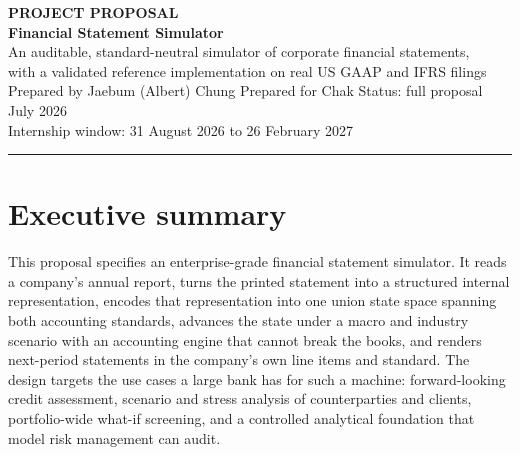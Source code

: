 \documentclass[11pt]{article}
\begin{document}
\color{bodytext}

\begin{flushleft}
{\color{gold}\bfseries PROJECT PROPOSAL}\\[3pt]
{\color{navy}\bfseries\fontsize{26}{30}\selectfont Financial Statement Simulator}\\[4pt]
{\color{slate}\large An auditable, standard-neutral simulator of corporate financial statements,\\ with a validated reference implementation on real US GAAP and IFRS filings}\\[6pt]
{\color{slate}\small Prepared by Jaebum (Albert) Chung \quad\textbar\quad Prepared for Chak \quad\textbar\quad Status: full proposal \quad\textbar\quad July 2026}\\[3pt]
{\color{slate}\small Internship window: 31 August 2026 to 26 February 2027}
\end{flushleft}
\vspace{4pt}
{\color{gold}\rule{\linewidth}{2pt}}
\vspace{6pt}

\section{Executive summary}
This proposal specifies an enterprise-grade financial statement simulator. It reads a company's annual report, turns the printed statement into a structured internal representation, encodes that representation into one union state space spanning both accounting standards, advances the state under a macro and industry scenario with an accounting engine that cannot break the books, and renders next-period statements in the company's own line items and standard. The design targets the use cases a large bank has for such a machine: forward-looking credit assessment, scenario and stress analysis of counterparties and clients, portfolio-wide what-if screening, and a controlled analytical foundation that model risk management can audit.
\end{document}
